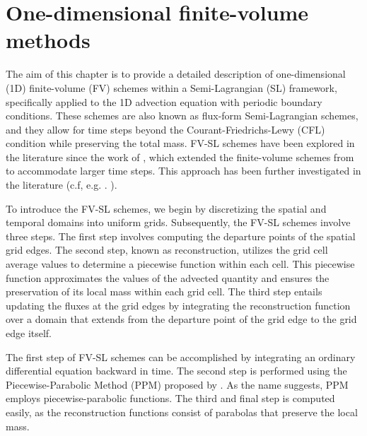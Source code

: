 \chapter{One-dimensional finite-volume methods}
\label{chp-1d-fv}

\theoremstyle{plain}
\newtheorem{lema}{Lemma}[chapter]

\theoremstyle{plain}
\newtheorem{prop}{Proposition}[chapter]

\theoremstyle{plain}
\newtheorem{thrm}{Theorem}[chapter]

\theoremstyle{plain}
\newtheorem{remark}{Remark}[chapter]

\theoremstyle{plain}
\newtheorem{corollary}{Corollary}[chapter]

\theoremstyle{plain}
\newtheorem{definition}{Definition}[chapter]

The aim of this chapter is to provide a detailed description of one-dimensional (1D) 
finite-volume (FV) schemes within a Semi-Lagrangian (SL) framework, specifically applied to 
the 1D advection equation with periodic boundary conditions. These schemes are also known 
as flux-form Semi-Lagrangian schemes, and they allow for time steps beyond the 
Courant-Friedrichs-Lewy (CFL) condition while preserving the total mass.
FV-SL schemes have been explored in the literature since the work of  \citet{leveque:1985},
which extended the finite-volume schemes from \citet{godunov:1959}  to accommodate larger time steps.
This approach has been further investigated in the literature (c.f, e.g. . \citet{lin:1996,leonard:1996}).

To introduce the FV-SL schemes, we begin by discretizing the spatial and temporal domains into uniform grids.
Subsequently, the FV-SL schemes involve three steps.
The first step involves computing the departure points of the spatial grid edges.
The second step, known as reconstruction, utilizes the grid cell average values to
determine a piecewise function within each cell. This piecewise function approximates the
values of the advected quantity and ensures the preservation of its local mass within each grid cell.
The third step entails updating the fluxes at the grid edges by integrating the reconstruction
function over a domain that extends from the departure point of the grid edge to the grid edge itself.

The first step of FV-SL schemes can be accomplished by integrating an ordinary differential
equation backward in time.
The second step is performed using the Piecewise-Parabolic Method (PPM) proposed by \citet{colella:1984}.
As the name suggests, PPM employs piecewise-parabolic functions.
The third and final step is computed easily, as the reconstruction functions consist of parabolas that preserve the local mass.

